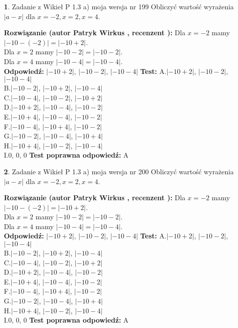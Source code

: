 \documentclass[12pt, a4paper]{article}
\theoremstyle{definition} %
\newtheorem{zad}{}
\newcommand{\zadStart}[1]{\begin{zad}#1\newline}
\newcommand{\zadStop}{\end{zad}}
\newcommand{\rozwStart}[2]{\noindent \textbf{Rozwiązanie (autor #1 , recenzent #2): }\newline}
\newcommand{\rozwStop}{\newline}
\newcommand{\odpStart}{\noindent \textbf{Odpowiedź:}\newline}
\newcommand{\odpStop}{\newline}
\newcommand{\testStart}{\noindent \textbf{Test:}\newline}
\newcommand{\testStop}{\newline}
\newcommand{\kluczStart}{\noindent \textbf{Test poprawna odpowiedź:}\newline}
\newcommand{\kluczStop}{\newline}
\begin{document}
\zadStart{Zadanie z Wikieł P 1.3 a) moja wersja nr 199}
Obliczyć wartość wyrażenia $|a - x|$ dla $x=-2,x=2,x=4$.
\zadStop
\rozwStart{Patryk Wirkus}{}
Dla $x = -2$ mamy $|-10 - (-2)| = |-10 + 2|$.\\
Dla $x = 2$ mamy $|-10 - 2| = |-10 - 2|$.\\
Dla $x = 4$ mamy $|-10 - 4| = |-10 - 4|$.\\
\rozwStop
\odpStart
$|-10 + 2|$, $|-10 - 2|$, $|-10 - 4|$
\odpStop
\testStart
A.$|-10 + 2|$, $|-10 - 2|$, $|-10 - 4|$\\
B.$|-10 - 2|$, $|-10 + 2|$, $|-10 - 4|$\\
C.$|-10 - 4|$, $|-10 - 2|$, $|-10 + 2|$\\
D.$|-10 + 2|$, $|-10 - 4|$, $|-10 - 2|$\\
E.$|-10 + 4|$, $|-10 - 4|$, $|-10 - 2|$\\
F.$|-10 - 4|$, $|-10 + 4|$, $|-10 - 2|$\\
G.$|-10 - 2|$, $|-10 - 4|$, $|-10 + 4|$\\
H.$|-10 + 4|$, $|-10 - 2|$, $|-10 - 4|$\\
I.$0$, $0$, $0$
\testStop
\kluczStart
A
\kluczStop



\zadStart{Zadanie z Wikieł P 1.3 a) moja wersja nr 200}
Obliczyć wartość wyrażenia $|a - x|$ dla $x=-2,x=2,x=4$.
\zadStop
\rozwStart{Patryk Wirkus}{}
Dla $x = -2$ mamy $|-10 - (-2)| = |-10 + 2|$.\\
Dla $x = 2$ mamy $|-10 - 2| = |-10 - 2|$.\\
Dla $x = 4$ mamy $|-10 - 4| = |-10 - 4|$.\\
\rozwStop
\odpStart
$|-10 + 2|$, $|-10 - 2|$, $|-10 - 4|$
\odpStop
\testStart
A.$|-10 + 2|$, $|-10 - 2|$, $|-10 - 4|$\\
B.$|-10 - 2|$, $|-10 + 2|$, $|-10 - 4|$\\
C.$|-10 - 4|$, $|-10 - 2|$, $|-10 + 2|$\\
D.$|-10 + 2|$, $|-10 - 4|$, $|-10 - 2|$\\
E.$|-10 + 4|$, $|-10 - 4|$, $|-10 - 2|$\\
F.$|-10 - 4|$, $|-10 + 4|$, $|-10 - 2|$\\
G.$|-10 - 2|$, $|-10 - 4|$, $|-10 + 4|$\\
H.$|-10 + 4|$, $|-10 - 2|$, $|-10 - 4|$\\
I.$0$, $0$, $0$
\testStop
\kluczStart
A
\kluczStop
\end{document}
